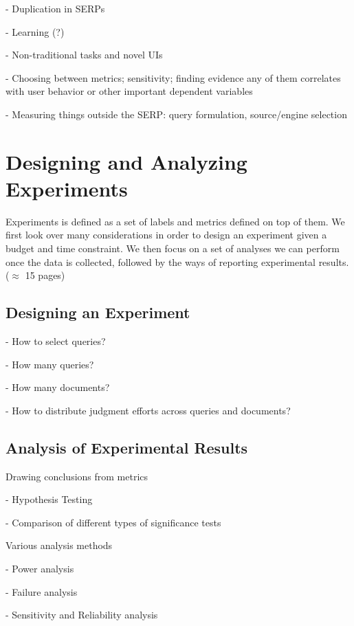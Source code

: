 \documentclass[openany]{now} %
\newcommand{\newpar}{\bigskip\noindent}
\begin{document}
- Duplication in SERPs

- Learning (?)

- Non-traditional tasks and novel UIs

- Choosing between metrics; sensitivity; finding evidence any of them correlates with user behavior or other important dependent variables

- Measuring things outside the SERP: query formulation, source/engine selection

\chapter{Designing and Analyzing Experiments}
\label{c-experiment-design}

Experiments is defined as a set of labels and metrics defined on top of them. We first look over many considerations in order to design an experiment given a budget and time constraint. We then focus on a set of analyses we can perform once the data is collected, followed by the ways of reporting experimental results. (\ensuremath{\approx} 15 pages)

\section{Designing an Experiment}

- How to select queries?

- How many queries? \cite{Sakai:2014}

- How many documents? \cite{CarterettePFK09}

- How to distribute judgment efforts across queries and documents? \cite{CarterettePKAA09, YilmazR09}


\section{Analysis of Experimental Results}

Drawing conclusions from metrics 

- Hypothesis Testing \cite{Dincer:2014}

- Comparison of different types of significance tests \cite{SmuckerAC09}

\newpar
Various analysis methods

- Power analysis \cite{Sakai:2014}

- Failure analysis

- Sensitivity and Reliability analysis \cite{Urbano:2013} 
\end{document}

